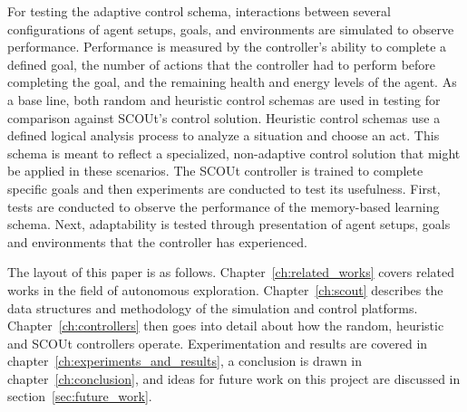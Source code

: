 {For testing the adaptive control schema, interactions between several configurations of agent setups, goals, and environments are simulated to observe performance.
Performance is measured by the controller's ability to complete a defined goal, the number of actions that the controller had to perform before completing the goal, and the remaining health and energy levels of the agent.
As a base line, both random and heuristic control schemas are used in testing for comparison against SCOUt's control solution.
Heuristic control schemas use a defined logical analysis process to analyze a situation and choose an act.
This schema is meant to reflect a specialized, non-adaptive control solution that might be applied in these scenarios.
The SCOUt controller is trained to complete specific goals and then experiments are conducted to test its usefulness.
First, tests are conducted to observe the performance of the memory-based learning schema.
Next, adaptability is tested through presentation of agent setups, goals and environments that the controller has experienced.

The layout of this paper is as follows.
Chapter~\ref{ch:related_works} covers related works in the field of autonomous exploration.
Chapter~\ref{ch:scout} describes the data structures and methodology of the simulation and control platforms.
Chapter~\ref{ch:controllers} then goes into detail about how the random, heuristic and SCOUt controllers operate.
Experimentation and results are covered in chapter~\ref{ch:experiments_and_results}, a conclusion is drawn in chapter~\ref{ch:conclusion}, and ideas for future work on this project are discussed in section~\ref{sec:future_work}.
}
